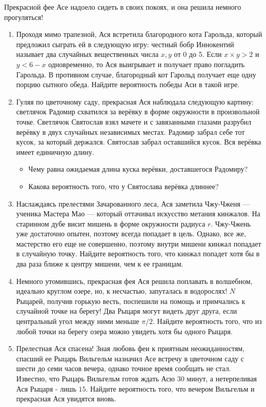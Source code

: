 \documentclass[a4paper,12pt]{article}
\begin{document}
Прекрасной фее Асе надоело сидеть в своих покоях, и она решила немного прогуляться!
\begin{enumerate} %
\item Проходя мимо трапезной, Ася встретила благородного  кота Гарольда, который предложил сыграть ей в следующую игру: честный бобр Иннокентий называет два случайных вещественных числа $x, y$ от 0 до 5. Если $ x \times y > 2$ и $ y < 6 - x$ одновременно, то Ася выигрывает и получает право погладить Гарольда. В противном случае, благородный кот Гарольд получает еще одну порцию сытного обеда.  Найдите вероятность победы Аси в такой игре.
\item Гуляя по цветочному саду, прекрасная Ася наблюдала следующую картину: светлячок Радомир схватился за верёвку в форме окружности в произвольной точке. Светлячок Святослав взял мачете и с завязанными глазами разрубил верёвку в двух случайных независимых местах. Радомир забрал себе тот кусок, за который держался. Святослав забрал оставшийся кусок. Вся верёвка имеет единичную длину.
\begin{itemize}
    \item Чему равна ожидаемая длина куска верёвки, доставшегося Радомиру?
    \item Какова вероятность того, что у Святослава верёвка длиннее?
\end{itemize}
\item Наслаждаясь прелестями Зачарованного леса, Ася заметила Чжу-Чженя — ученика Мастера Мао — который оттачивал искусство метания кинжалов. На старинном дубе висит мишень в форме окружности радиуса $r$.
Чжу-Чжень уже достаточно опытен, поэтому всегда попадает в цель.
Однако, все же, мастерство его еще не совершенно, поэтому внутри мишени кинжал попадает в случайную точку.
Найдите вероятность того, что кинжал попадет хотя бы в два раза ближе к центру мишени, чем к ее границам.
\item Немного утомившись, прекрасная фея Ася решила поплавать в волшебном, идеально круглом озере, но, к несчастью, запуталась в водорослях! $N$ Рыцарей, получив горькую весть, поспешили на помощь и примчались к случайной точке на берегу! Два Рыцаря могут видеть друг друга, если центральный угол между ними меньше $\pi/2$. Найдите вероятность того, что из любой точки на берегу озера можно увидеть хотя бы одного Рыцаря.
\item Прелестная Ася спасена! Зная любовь феи к приятным неожиданностям, спасший ее Рыцарь Вильгельм назначил Асе встречу в цветочном саду с шести до семи часов вечера, однако точное время сообщать не стал. Известно, что Рыцарь Вильгельм готов ждать Асю $30$ минут, а нетерпеливая Ася Рыцаря - лишь $15$. Найдите вероятность того, что вечером Вильгельм и прекрасная Ася увидятся вновь.

\end{enumerate}
\end{document}
